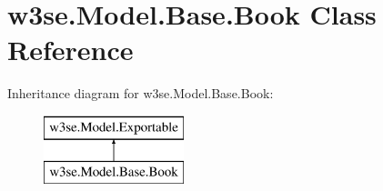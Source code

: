 \hypertarget{classw3se_1_1_model_1_1_base_1_1_book}{\section{w3se.\-Model.\-Base.\-Book Class Reference}
\label{classw3se_1_1_model_1_1_base_1_1_book}
}
Inheritance diagram for w3se.\-Model.\-Base.\-Book\-:\begin{figure}[H]
\begin{center}
\leavevmode
\includegraphics[height=2.000000cm]{classw3se_1_1_model_1_1_base_1_1_book}
\end{center}
\end{figure}
